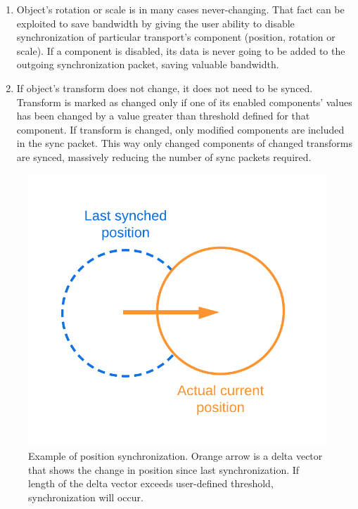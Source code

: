 \documentclass[times, utf8, diplomski]{fer}
\begin{document}
\begin{enumerate}
	\item Object's rotation or scale is in many cases never-changing. That fact can be exploited to save bandwidth by giving the user ability to disable synchronization of particular transport's component (position, rotation or scale). If a component is disabled, its data is never going to be added to the outgoing synchronization packet, saving valuable bandwidth.
	
	\item If object's transform does not change, it does not need to be synced. Transform is marked as changed only if one of its enabled components' values has been changed by a value greater than threshold defined for that component. If transform is changed, only modified components are included in the sync packet. This way only changed components of changed transforms are synced, massively reducing the number of sync packets required.
\end{enumerate}

\begin{figure}[H]
	\centering
	\includegraphics[scale=0.28]{NetworkTransform-position-diagram}
	\caption{Example of position synchronization. Orange arrow is a delta vector that shows the change in position since last synchronization. If length of the delta vector exceeds user-defined threshold, synchronization will occur.}
	\label{fig:network-transform-position-diagram}
\end{figure}
\end{document}
